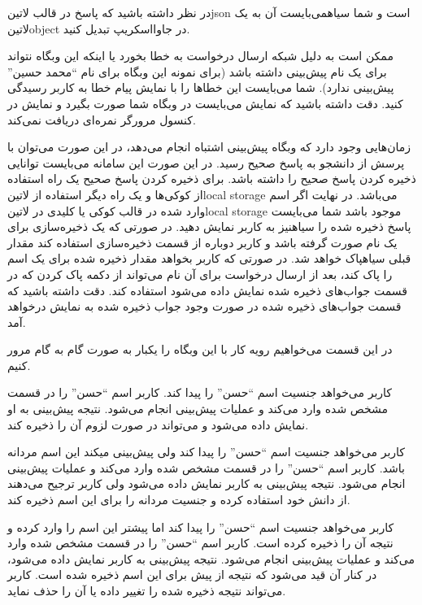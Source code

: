 \documentclass[../main.tex]{subfiles}
\begin{document}
در نظر داشته باشید که پاسخ در قالب ‌لاتین{json} است و شما ‌سیاه{می‌بایست} آن به یک ‌لاتین{object} در جاوااسکریپ تبدیل کنید.

ممکن است به دلیل شبکه ارسال درخواست به خطا بخورد یا اینکه این وبگاه نتواند برای یک نام پیش‌بینی داشته باشد (برای نمونه این وبگاه برای نام ``محمد حسین'' پیش‌بینی ندارد). شما می‌بایست این خطاها را با نمایش پیام خطا به کاربر رسیدگی کنید. دقت داشته باشید که نمایش می‌بایست در وبگاه شما صورت بگیرد و نمایش در کنسول مرورگر نمره‌ای دریافت نمی‌کند.

زمان‌هایی وجود دارد که وبگاه پیش‌بینی اشتباه انجام می‌دهد، در این صورت می‌توان با پرسش از دانشجو به پاسخ صحیح رسید. در این صورت این سامانه می‌بایست توانایی ذخیره کردن پاسخ صحیح را داشته باشد. برای ذخیره کردن پاسخ صحیح یک راه استفاده از کوکی‌ها و یک راه دیگر استفاده از ‌لاتین{local storage} می‌باشد.
در نهایت اگر اسم وارد شده در قالب کوکی یا کلیدی در ‌لاتین{local storage} موجود باشد شما می‌بایست پاسخ ذخیره شده را ‌سیاه{نیز} به کاربر نمایش دهید.
در صورتی که یک ذخیره‌سازی برای یک نام صورت گرفته باشد و کاربر دوباره از قسمت ذخیره‌سازی استفاده کند مقدار قبلی ‌سیاه{پاک} خواهد شد.
در صورتی که کاربر بخواهد مقدار ذخیره شده برای یک اسم را پاک کند، بعد از ارسال درخواست برای آن نام می‌تواند از دکمه پاک کردن که در قسمت جواب‌های ذخیره شده نمایش داده می‌شود استفاده کند. دقت داشته باشید که قسمت جواب‌های ذخیره شده
در صورت وجود جواب ذخیره شده به نمایش درخواهد آمد.


در این قسمت می‌خواهیم رویه کار با این وبگاه را یکبار به صورت گام به گام مرور کنیم.

 کاربر می‌خواهد جنسیت اسم ``حسن'' را پیدا کند.
 کاربر اسم ``حسن'' را در قسمت مشخص شده وارد می‌کند و عملیات پیش‌بینی انجام می‌شود.
 نتیجه پیش‌بینی به او نمایش داده می‌شود و می‌تواند در صورت لزوم آن را ذخیره کند.

 کاربر می‌خواهد جنسیت اسم ``حسن'' را پیدا کند ولی پیش‌بینی میکند این اسم مردانه باشد.
 کاربر اسم ``حسن'' را در قسمت مشخص شده وارد می‌کند و عملیات پیش‌بینی انجام می‌شود.
 نتیجه پیش‌بینی به کاربر نمایش داده می‌شود ولی کاربر ترجیح می‌دهند از دانش خود استفاده کرده و جنسیت مردانه را برای این اسم ذخیره کند.

 کاربر می‌خواهد جنسیت اسم ``حسن'' را پیدا کند اما پیشتر این اسم را وارد کرده و نتیجه آن را ذخیره کرده است.
 کاربر اسم ``حسن'' را در قسمت مشخص شده وارد می‌کند و عملیات پیش‌بینی انجام می‌شود.
 نتیجه پیش‌بینی به کاربر نمایش داده می‌شود، در کنار آن قید می‌شود که نتیجه از پیش برای این اسم ذخیره شده است.
 کاربر می‌تواند نتیجه ذخیره شده را تغییر داده یا آن را حذف نماید.
\end{document}
